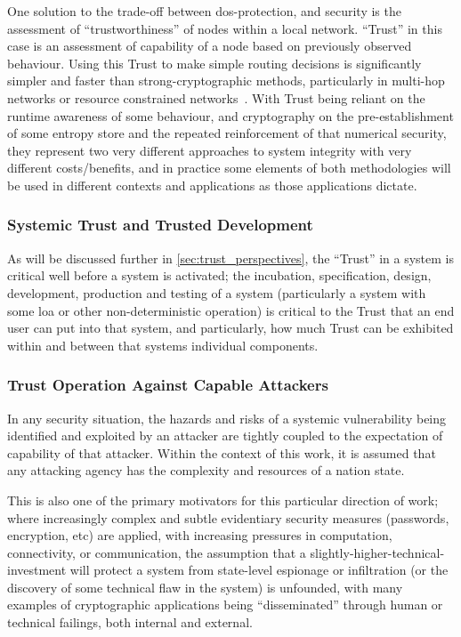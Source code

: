 One solution to the trade-off between \gls{dos}-protection, and security is the assessment of ``trustworthiness'' of nodes within a local network. 
``Trust'' in this case is an assessment of capability of a node based on previously observed behaviour.
Using this Trust to make simple routing decisions is significantly simpler and faster than strong-cryptographic methods, particularly in multi-hop networks or resource constrained networks~\cite{Cordasco2008}.
With Trust being reliant on the runtime awareness of some behaviour, and cryptography on the pre-establishment of some entropy store and the repeated reinforcement of that numerical security, they represent two very different approaches to system integrity with very different costs/benefits, and in practice some elements of both methodologies will be used in different contexts and applications as those applications dictate.

\subsubsection{Systemic Trust and Trusted Development}
As will be discussed further in \autoref{sec:trust_perspectives}, the ``Trust'' in a system is critical well before a system is activated; the incubation, specification, design, development, production and testing of a system (particularly a system with some \gls{loa} or other non-deterministic operation) is critical to the Trust that an end user can put into that system, and particularly, how much Trust can be exhibited within and between that systems individual components.


\subsubsection{Trust Operation Against Capable Attackers}\label{sec:capable_attackers}

In any security situation, the hazards and risks of a systemic vulnerability being identified and exploited by an attacker are tightly coupled to the expectation of capability of that attacker.
Within the context of this work, it is assumed that any attacking agency has the complexity and resources of a nation state.

This is also one of the primary motivators for this particular direction of work; where increasingly complex and subtle evidentiary security measures (passwords, encryption, etc) are applied, with increasing pressures in computation, connectivity, or communication, the assumption that a slightly-higher-technical-investment will protect a system from state-level espionage or infiltration (or the discovery of some technical flaw in the system) is unfounded, with many examples of cryptographic applications being ``disseminated'' through human or technical failings, both internal and external. 


